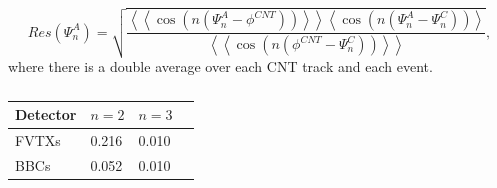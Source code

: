 \begin{equation}
Res(\Psi_n^A) = \sqrt{\frac{\left<\left<\cos(n(\Psi_n^A - \phi^{CNT}))\right>\right>\left<\cos(n(\Psi_n^A - \Psi_n^C))\right>}{\left<\left<\cos(n(\phi^{CNT} - \Psi_n^C))\right>\right>}},
\end{equation}
where there is a double average over each CNT track and each event.
\begin{table}[h!]
\caption{}
\begin{center}
    \begin{tabular}{| l | l | l | l |}
    \hline
    Detector & $n=2$ & $n=3$  \\ \hline
    FVTXs & 0.216 & 0.010 \\ \hline
    BBCs & 0.052 & 0.010  \\ \hline
    \end{tabular}
\end{center}
\end{table}

